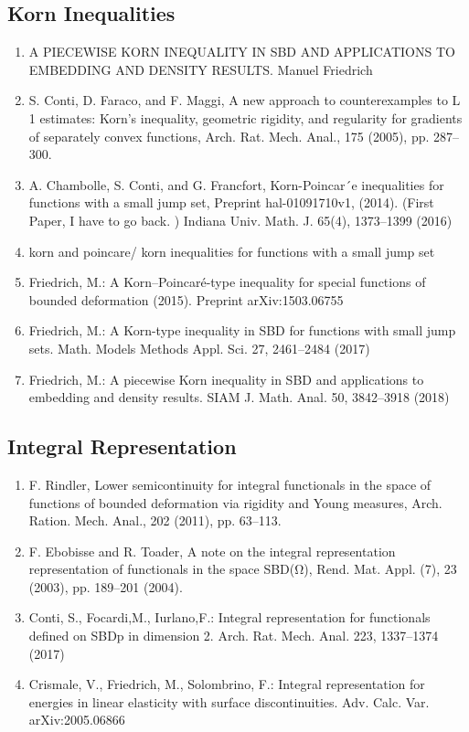 \subsection{Korn Inequalities}
\begin{enumerate}
\item A PIECEWISE KORN INEQUALITY IN SBD AND APPLICATIONS TO
EMBEDDING AND DENSITY RESULTS. Manuel Friedrich
\item S. Conti, D. Faraco, and F. Maggi, A new approach to counterexamples to L
1
estimates: Korn’s inequality, geometric rigidity, and
regularity for gradients of separately convex functions, Arch. Rat. Mech.
Anal., 175 (2005), pp. 287–300.
\item A. Chambolle, S. Conti, and G. Francfort, Korn-Poincar´e inequalities for functions with a small jump set, Preprint hal-01091710v1,
(2014). (First Paper, I have to go back. ) Indiana Univ. Math. J. 65(4), 1373–1399 (2016)

\item   korn and poincare/ korn inequalities for functions with a small jump set
\item Friedrich, M.: A Korn–Poincaré-type inequality for special functions of bounded deformation (2015). Preprint arXiv:1503.06755
\item Friedrich, M.: A Korn-type inequality in SBD for functions with small jump sets. Math. Models Methods Appl. Sci. 27, 2461–2484 (2017)
\item Friedrich, M.: A piecewise Korn inequality in SBD and applications to embedding and density
results. SIAM J. Math. Anal. 50, 3842–3918 (2018)
\end{enumerate}
\subsection{ Integral Representation}
\begin{enumerate}
\item F. Rindler, Lower semicontinuity for integral functionals in the space
of functions of bounded deformation via rigidity and Young measures,
Arch. Ration. Mech. Anal., 202 (2011), pp. 63–113.
\item F. Ebobisse and R. Toader, A note on the integral representation
representation of functionals in the space SBD(Ω), Rend. Mat. Appl.
(7), 23 (2003), pp. 189–201 (2004).
\item Conti, S., Focardi,M., Iurlano,F.: Integral representation for functionals defined on SBDp in dimension 2. Arch. Rat. Mech. Anal. 223, 1337–1374 (2017)
\item Crismale, V., Friedrich, M., Solombrino, F.: Integral representation for energies in linear elasticity with surface discontinuities. Adv. Calc. Var. arXiv:2005.06866
\end{enumerate}
